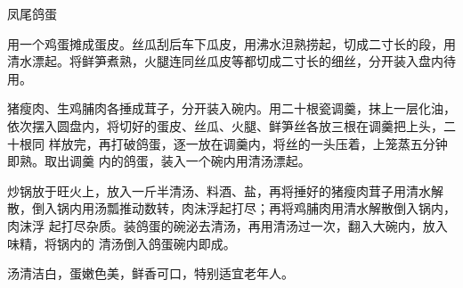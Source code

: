 \begin{recipe}{凤尾鸽蛋}

\ingredients


\preparation

\step 用一个鸡蛋摊成蛋皮。丝瓜刮后车下瓜皮，用沸水泹熟捞起，切成二寸长的段，用
清水漂起。将鲜笋煮熟，火腿连同丝瓜皮等都切成二寸长的细丝，分开装入盘内待用。

\step 猪瘦肉、生鸡脯肉各捶成茸子，分开装入碗内。用二十根瓷调羹，抹上一层化油，
依次摆入圆盘内，将切好的蛋皮、丝瓜、火腿、鲜笋丝各放三根在调羹把上头，二十根同
样放完，再打破鸽蛋，逐一放在调羹内，将丝的一头压着，上笼蒸五分钟即熟。取出调羹
内的鸽蛋，装入一个碗内用清汤漂起。

\step 炒锅放于旺火上，放入一斤半清汤、料酒、盐，再将捶好的猪瘦肉茸子用清水解
散，倒入锅内用汤瓢推动数转，肉沫浮起打尽；再将鸡脯肉用清水解散倒入锅内，肉沫浮
起打尽杂质。装鸽蛋的碗泌去清汤，再用清汤过一次，翻入大碗内，放入味精，将锅内的
清汤倒入鸽蛋碗内即成。

\features

汤清洁白，蛋嫩色美，鲜香可口，特别适宜老年人。

\end{recipe}

